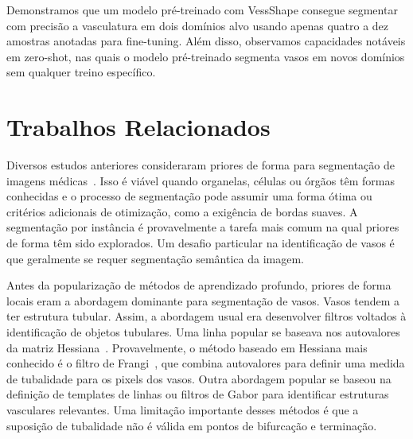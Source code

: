 \documentclass[%
reprint,
nofootinbib,
 amsmath,amssymb,
aps,
floatfix,
superscriptaddress,
showkeys,
longbibliography
]{revtex4-1}
\begin{document}
Demonstramos que um modelo pré-treinado com VessShape consegue segmentar com precisão a vasculatura em dois domínios alvo usando apenas quatro a dez amostras anotadas para fine-tuning. Além disso, observamos capacidades notáveis em zero-shot, nas quais o modelo pré-treinado segmenta vasos em novos domínios sem qualquer treino específico.

\section{Trabalhos Relacionados}
\label{sec:related}

Diversos estudos anteriores consideraram priores de forma para segmentação de imagens médicas~\cite{bohlender2021survey,heimann2009statistical,cootes1995active}. Isso é viável quando organelas, células ou órgãos têm formas conhecidas e o processo de segmentação pode assumir uma forma ótima ou critérios adicionais de otimização, como a exigência de bordas suaves. A segmentação por instância é provavelmente a tarefa mais comum na qual priores de forma têm sido explorados. Um desafio particular na identificação de vasos é que geralmente se requer segmentação semântica da imagem. 

Antes da popularização de métodos de aprendizado profundo, priores de forma locais eram a abordagem dominante para segmentação de vasos. Vasos tendem a ter estrutura tubular. Assim, a abordagem usual era desenvolver filtros voltados à identificação de objetos tubulares. Uma linha popular se baseava nos autovalores da matriz Hessiana~\cite{fraz2012blood,sato1998three}. Provavelmente, o método baseado em Hessiana mais conhecido é o filtro de Frangi~\cite{frangi1998multiscale}, que combina autovalores para definir uma medida de tubalidade para os pixels dos vasos. Outra abordagem popular se baseou na definição de templates de linhas ou filtros de Gabor para identificar estruturas vasculares relevantes. Uma limitação importante desses métodos é que a suposição de tubalidade não é válida em pontos de bifurcação e terminação.
\end{document}

